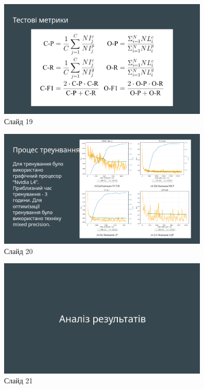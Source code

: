 \documentclass{udstu}
\begin{document}
\begin{figure}[!ht]
	\centering
	\includegraphics[width=0.9\textwidth]{PNG/present/present-19}
	\caption{Слайд 19}
\end{figure}

\begin{figure}[!ht]
	\centering
	\includegraphics[width=0.9\textwidth]{PNG/present/present-20}
	\caption{Слайд 20}
\end{figure}

\begin{figure}[!ht]
	\centering
	\includegraphics[width=0.9\textwidth]{PNG/present/present-21}
	\caption{Слайд 21}
\end{figure}
\end{document}
